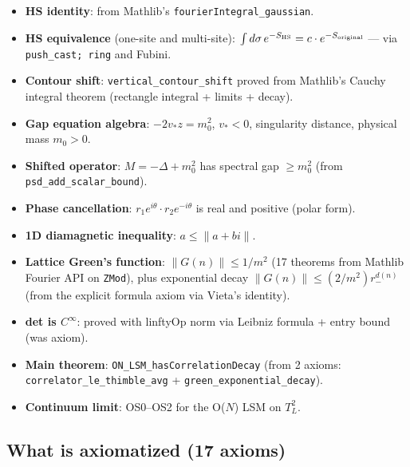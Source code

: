 \documentclass[12pt]{article}
\theoremstyle{definition}
\theoremstyle{remark}
\begin{document}
\begin{itemize}
\item \textbf{HS identity}: from Mathlib's
  \texttt{fourierIntegral\_gaussian}.
\item \textbf{HS equivalence} (one-site and multi-site):
  $\int d\sigma\,e^{-S_{\rm HS}} = c\cdot e^{-S_{\rm original}}$
  --- via \texttt{push\_cast; ring} and Fubini.
\item \textbf{Contour shift}: \texttt{vertical\_contour\_shift}
  proved from Mathlib's Cauchy integral theorem (rectangle integral
  + limits + decay).
\item \textbf{Gap equation algebra}: $-2v_* z = m_0^2$, $v_* < 0$,
  singularity distance, physical mass $m_0 > 0$.
\item \textbf{Shifted operator}: $M = -\Delta + m_0^2$ has spectral
  gap $\ge m_0^2$ (from \texttt{psd\_add\_scalar\_bound}).
\item \textbf{Phase cancellation}: $r_1 e^{i\theta} \cdot r_2 e^{-i\theta}$
  is real and positive (polar form).
\item \textbf{1D diamagnetic inequality}: $a \le \|a + bi\|$.
\item \textbf{Lattice Green's function}: $\|G(n)\| \le 1/m^2$
  (17 theorems from Mathlib Fourier API on \texttt{ZMod}),
  plus exponential decay $\|G(n)\| \le (2/m^2) r_-^{d(n)}$
  (from the explicit formula axiom via Vieta's identity).
\item \textbf{det is $C^\infty$}: proved with linftyOp norm
  via Leibniz formula + entry bound (was axiom).
\item \textbf{Main theorem}: \texttt{ON\_LSM\_hasCorrelationDecay}
  (from 2 axioms: \texttt{correlator\_le\_thimble\_avg} +
  \texttt{green\_exponential\_decay}).
\item \textbf{Continuum limit}: OS0--OS2 for the O($N$) LSM on $T^2_L$.
\end{itemize}

\subsection{What is axiomatized (17 axioms)}
\end{document}
